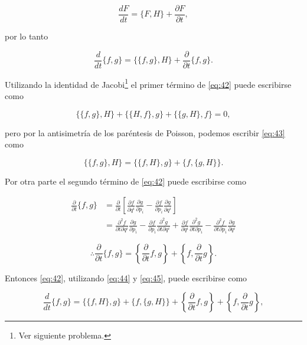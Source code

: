 \documentclass[a4paper,10pt]{article}
\numberwithin{equation}{section}
\begin{document}
\begin{equation}
 \frac{dF}{dt} = \{F,H\} + \frac{\partial F}{\partial t},
 \label{eq:41}
\end{equation}

por lo tanto

\begin{equation}
 \frac{d}{dt}\{f,g\} = \{\{f,g\},H\} + \frac{\partial}{\partial t}\{f,g\}.
 \label{eq:42}
\end{equation}

Utilizando la identidad de Jacobi\footnote{Ver siguiente problema.} el primer término 
de \eqref{eq:42} puede escribirse como

\begin{equation}
 \{\{f,g\},H\} +  \{\{H,f\},g\} +  \{\{g,H\},f\} = 0,
 \label{eq:43}
\end{equation}

pero por la antisimetría de los paréntesis de Poisson, podemos escribir \eqref{eq:43} 
como

\begin{equation}
  \{\{f,g\},H\} = \{\{f,H\},g\} + \{f,\{g,H\}\}.
 \label{eq:44}
\end{equation}

Por otra parte el segundo término de \eqref{eq:42} puede escribirse como 

\begin{align*}
 \frac{\partial}{\partial t}\{f,g\} &= \frac{\partial}{\partial t}
 \left[\frac{\partial f}{\partial q^i}\frac{\partial g}{\partial p_i} - 
 \frac{\partial f}{\partial p_i}\frac{\partial g}{\partial q^i}\right] \\
 &= \frac{\partial^2 f}{\partial t\partial q^i}\frac{\partial g}{\partial p_i} 
 - \frac{\partial f}{\partial p_i}\frac{\partial^2 g}{\partial t \partial q^i}
 + \frac{\partial f}{\partial q^i}\frac{\partial^2 g}{\partial t \partial p_i}
 - \frac{\partial^2 f}{\partial t\partial p_i}\frac{\partial g}{\partial q^i} 
\end{align*}

\begin{equation}
 \therefore \frac{\partial}{\partial t}\{f,g\} = \left\{\frac{\partial}{\partial t}f,g\right\}
 + \left\{f, \frac{\partial}{\partial t}g\right\}.
 \label{eq:45}
\end{equation}

Entonces \eqref{eq:42}, utilizando \eqref{eq:44} y \eqref{eq:45}, puede escribirse como

\begin{equation}
 \frac{d}{dt}\{f,g\} =  \{\{f,H\},g\} + \{f,\{g,H\}\} + \left\{\frac{\partial}{\partial t}f,g\right\}
 + \left\{f, \frac{\partial}{\partial t}g\right\},
 \label{eq:46}
\end{equation}
\end{document}
